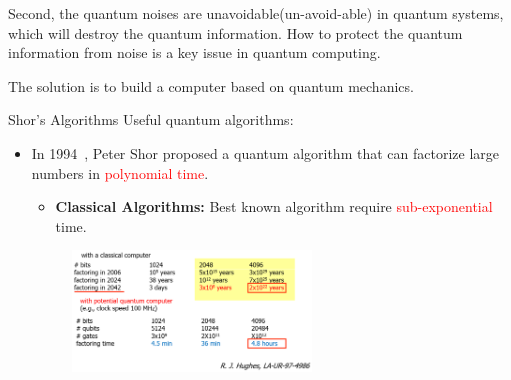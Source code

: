 \documentclass[10pt]{beamer}
\begin{document}
\begin{CJK}{UTF8}{gbsn}
{  Second, the quantum noises are unavoidable(un-avoid-able) in quantum systems, which will destroy the quantum information.
  How to protect the quantum information from noise is a key issue in quantum computing.
  


The solution is to build a computer based on quantum mechanics. 


}


\begin{frame}[fragile]{Shor's Algorithms}
  Useful quantum algorithms:
  \begin{itemize}
    \item In 1994~, Peter Shor proposed a quantum algorithm that can factorize large numbers in \textcolor{red}{polynomial time}.
    \begin{itemize}
      \item \textbf{Classical Algorithms:} Best known algorithm require \textcolor{red}{sub-exponential} time.
    \end{itemize}

    \vspace{1em}
    \begin{figure}
      \centering
      \includegraphics[width=0.6\textwidth]{fig/shor.png}
    \end{figure}
  \end{itemize}
\end{frame}
\end{CJK}
\end{document}
